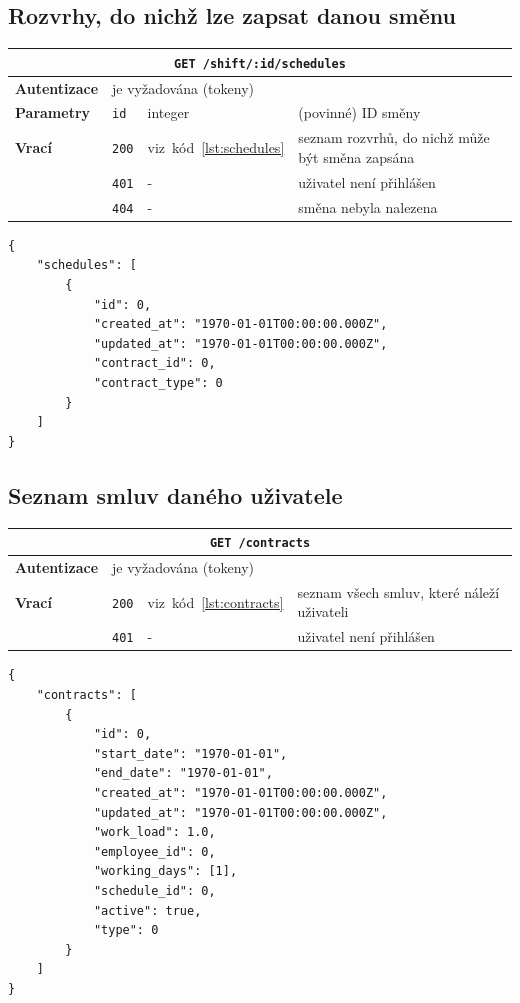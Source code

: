 \documentclass[twoside]{ctuthesis}
\begin{document}
\subsection{Rozvrhy, do nichž lze zapsat danou směnu}
\begin{center}
	\begin{tabular}{p{.19\linewidth}p{.18\linewidth}p{.15\linewidth}p{.35\linewidth}}
		\hline
		\multicolumn{4}{c}{\texttt{GET /shift/:id/schedules}}\\
		\hline
		\textbf{Autentizace}  & 	\multicolumn{3}{l}{je vyžadována (tokeny)}\\
		\textbf{Parametry} 		& \texttt{id} & integer & (povinné) ID směny \\
		\textbf{Vrací} 				& \texttt{200} & viz~kód~\ref{lst:schedules} & seznam rozvrhů, do nichž může být směna zapsána\\
									 				& \texttt{401} & - & uživatel není přihlášen\\
													& \texttt{404} & - & směna nebyla nalezena\\
		\hline
	\end{tabular}
\end{center}

\begin{lstlisting}[caption={Rozvrhy, do nichž může být směna zapsána},label={lst:schedules}]
{
	"schedules": [
		{
			"id": 0,
			"created_at": "1970-01-01T00:00:00.000Z",
			"updated_at": "1970-01-01T00:00:00.000Z",
			"contract_id": 0,
			"contract_type": 0
		}
	]
}
\end{lstlisting}

\subsection{Seznam smluv daného uživatele}
\begin{center}
	\begin{tabular}{p{.19\linewidth}p{.18\linewidth}p{.15\linewidth}p{.35\linewidth}}
		\hline
		\multicolumn{4}{c}{\texttt{GET /contracts}}\\
		\hline
		\textbf{Autentizace}  & 	\multicolumn{3}{l}{je vyžadována (tokeny)}\\
		\textbf{Vrací} 				& \texttt{200} & viz~kód~\ref{lst:contracts} & seznam všech smluv, které náleží uživateli\\
									 				& \texttt{401} & - & uživatel není přihlášen\\
		\hline
	\end{tabular}
\end{center}
\begin{lstlisting}[caption={Seznam smluv uživatele},label={lst:contracts}]
{
	"contracts": [
		{
			"id": 0,
			"start_date": "1970-01-01",
			"end_date": "1970-01-01",
			"created_at": "1970-01-01T00:00:00.000Z",
			"updated_at": "1970-01-01T00:00:00.000Z",
			"work_load": 1.0,
			"employee_id": 0,
			"working_days": [1],
			"schedule_id": 0,
			"active": true,
			"type": 0
		}
	]
}
\end{lstlisting}
\end{document}
